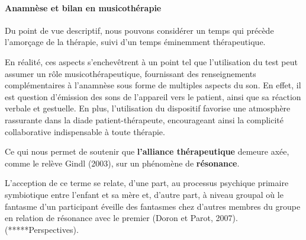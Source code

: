 
\paragraph{\textbf{Anamnèse et bilan en musicothérapie}}
Du point de vue descriptif, nous pouvons considérer un temps qui
précède 
l'amorçage de la thérapie, suivi d'un temps éminemment thérapeutique.


En réalité, ces aspects s'enchevêtrent à un point tel que
l'utilisation du test peut assumer un rôle musicothérapeutique, fournissant des
  renseignements complémentaires à l'anamnèse sous forme de multiples
  aspects du son. En effet, il est  question d'émission des sons de
  l'appareil vers le patient, ainsi que sa réaction verbale et gestuelle.
En plus, l'utilisation
   du dispositif favorise une atmosphère rassurante dans la diade
   patient-thérapeute, encourageant ainsi la complicité collaborative 
 indispensable à toute
 thérapie.

 
Ce qui nous permet de soutenir que 
 \textbf{l'alliance thérapeutique} demeure axée, comme le relève Gindl (2003), sur 
 un phénomène de \textbf{résonance}.

 
 L'acception de ce terme se relate, d'une part, au processus psychique
primaire symbiotique entre l'enfant et sa mère et, d'autre part, à
niveau groupal où le fantasme d'un participant éveille des fantasmes chez d'autres membres du groupe en relation
de résonance  avec le premier (Doron
et Parot, 2007). \autocite {doronparot} (*****Perspectives).


